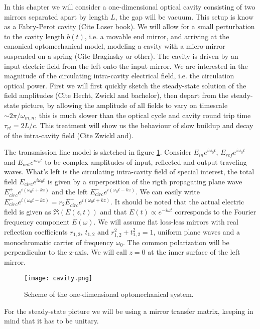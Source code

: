 In this chapter we will consider a one-dimensional optical cavity consisting of two mirrors separated apart by length $L$, the gap will be vacuum. This setup is know as a Fabry-Perot cavity (Cite Laser book). We will allow for a small perturbation to the cavity length $b(t)$, i.e. a movable end mirror, and arriving at the canonical optomechanical model, modeling a cavity with a micro-mirror suspended on a spring (Cite Braginsky or other). The cavity is driven by an input electric field from the left onto the input mirror. We are interested in the magnitude of the circulating intra-cavity electrical field, i.e. the circulation optical power. First we will first quickly sketch the steady-state solution of the field amplitudes (Cite Hecht, Zwickl and bachelor), then depart from the steady-state picture, by allowing the amplitude of all fields to vary on timescale $\sim 2\pi/\omega_{m,n}$, this is much slower than the optical cycle and cavity round trip time $\tau_{rt} = 2L/c$. This treatment will show us the behaviour of slow buildup and decay of the intra-cavity field (Cite Zwickl and\parencite{Wilson2011}).

The transmission line model is sketched in figure \ref{fig:cavity_model}. Consider $E_{in}e^{i\omega_0 t}$, $E_{ref}e^{i\omega_0 t}$ and $E_{out}e^{i\omega_0 t}$ to be complex amplitudes of input, reflected and output traveling waves. What's left is the circulating intra-cavity field of special interest, the total field $E_{circ}e^{i\omega_0 t}$ is given by a superposition of the rigth propagating plane wave $E_{circ}^+e^{i(\omega_0 t + kz)}$ and the left $E_{circ}^-e^{i(\omega_0 t - kz)}$. We can easily write $E_{circ}^-e^{i(\omega_0 t - kz)} = r_2E_{circ}^+e^{i(\omega_0 t + kz)}$. It should be noted that the actual electric field is given as $\Re(E(z, t))$ and that $E(t) \propto e^{-i\omega t}$ corresponds to the Fourier frequency component $E(\omega)$. We will assume flat loss-less mirrors with real reflection coefficients $r_{1,2}$, $t_{1,2}$ and $r_{1,2}^2 + t_{1,2}^2 = 1$, uniform plane waves and a monochromatic carrier of frequency $\omega_0$. The common polarization will be perpendicular to the z-axis. We will call $z = 0$ at the inner surface of the left mirror.

\begin{figure}[h!]
\centering
\texttt{[image: cavity.png]}
\caption{Scheme of the one-dimensional optomechanical system.}
\label{fig:cavity_model}
\end{figure}

For the steady-state picture we will be using a mirror transfer matrix, keeping in mind that it has to be unitary.

